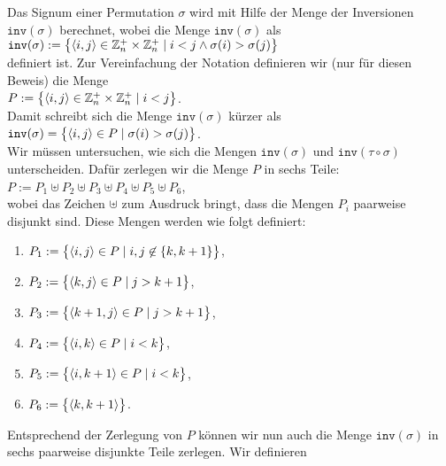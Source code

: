 \proof
Das Signum einer Permutation $\sigma$ wird mit Hilfe der Menge der Inversionen $\mathtt{inv}(\sigma)$
berechnet, wobei die Menge $\mathtt{inv}(\sigma)$ als
\\[0.2cm]
\hspace*{1.3cm}
$\mathtt{inv}(\sigma) := \bigl\{ \pair(i,j) \in \mathbb{Z}_n^+ \times \mathbb{Z}_n^+ \mid i < j \wedge \sigma(i) > \sigma(j) \bigr\}$
\\[0.2cm]
definiert ist.  Zur Vereinfachung der Notation definieren wir (nur f\"ur diesen Beweis) die Menge
\\[0.2cm]
\hspace*{1.3cm}
$P := \bigl\{ \pair(i,j) \in \mathbb{Z}_n^+ \times \mathbb{Z}_n^+ \mid i < j \bigr\}$.
\\[0.2cm]
Damit schreibt sich die Menge $\mathtt{inv}(\sigma)$ k\"urzer als
\\[0.2cm]
\hspace*{1.3cm}
$\mathtt{inv}(\sigma) = \bigl\{ \pair(i,j) \in P \mid \sigma(i) > \sigma(j) \bigr\}$.
\\[0.2cm]
Wir m\"ussen untersuchen, wie sich die Mengen $\mathtt{inv}(\sigma)$ und $\mathtt{inv}(\tau \circ \sigma)$
unterscheiden.  Daf\"ur zerlegen wir die Menge $P$ in sechs Teile:
\\[0.2cm]
\hspace*{1.3cm}
$P := P_1 \uplus P_2 \uplus P_3 \uplus P_4 \uplus P_5 \uplus P_6$,
\\[0.2cm]
wobei das Zeichen $\uplus$ zum Ausdruck bringt, dass die Mengen $P_i$ paarweise disjunkt sind.
Diese Mengen werden wie folgt definiert:
\begin{enumerate}
\item $P_1 := \bigl\{ \pair(i,j) \in P \mid i,j \not\in \{k,k+1\} \bigr\}$,
\item $P_2 := \bigl\{ \pair(k,j) \in P \mid j > k+1 \bigr\}$, 
\item $P_3 := \bigl\{ \pair(k+1,j) \in P \mid j > k+1 \bigr\}$, 
\item $P_4 := \bigl\{ \pair(i,k) \in P \mid i < k \bigr\}$, 
\item $P_5 := \bigl\{ \pair(i,k+1) \in P \mid i < k \bigr\}$, 
\item $P_6 := \bigl\{ \pair(k,k+1) \bigr\}$.
\end{enumerate} 
Entsprechend der Zerlegung von $P$ k\"onnen wir nun auch die Menge $\mathtt{inv}(\sigma)$ in sechs
paarweise disjunkte Teile zerlegen.  Wir definieren
\\[0.2cm]
\hspace*{1.3cm}
